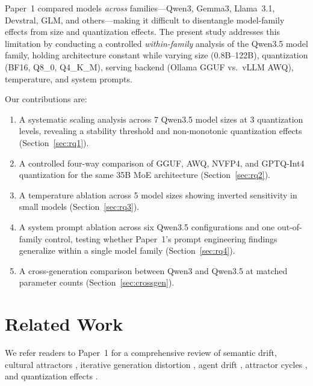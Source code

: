 \documentclass[11pt]{article}
\begin{document}
Paper~1 compared models \emph{across} families---Qwen3, Gemma3, Llama~3.1,
Devstral, GLM, and others---making it difficult to disentangle model-family
effects from size and quantization effects. The present study addresses this
limitation by conducting a controlled \emph{within-family} analysis of the
Qwen3.5 model family, holding architecture constant while varying size
(0.8B--122B), quantization (BF16, Q8\_0, Q4\_K\_M), serving backend
(Ollama GGUF vs.\ vLLM AWQ), temperature, and system prompts.

Our contributions are:
\begin{enumerate}[leftmargin=*]
  \item A systematic scaling analysis across 7 Qwen3.5 model sizes at 3
        quantization levels, revealing a stability threshold and non-monotonic
        quantization effects (Section~\ref{sec:rq1}).
  \item A controlled four-way comparison of GGUF, AWQ, NVFP4, and GPTQ-Int4
        quantization for the same 35B MoE architecture
        (Section~\ref{sec:rq2}).
  \item A temperature ablation across 5 model sizes showing inverted
        sensitivity in small models (Section~\ref{sec:rq3}).
  \item A system prompt ablation across six Qwen3.5 configurations and one
        out-of-family control, testing whether Paper~1's prompt engineering
        findings generalize within a single model family
        (Section~\ref{sec:rq4}).
  \item A cross-generation comparison between Qwen3 and Qwen3.5 at matched
        parameter counts (Section~\ref{sec:crossgen}).
\end{enumerate}

\section{Related Work}
\label{sec:related}

We refer readers to Paper~1 \citep{smith2026semantic} for a comprehensive
review of semantic drift, cultural attractors \citep{perez2025cultural,
brinkmann2023machine}, iterative generation distortion
\citep{mohamed2025broken}, agent drift \citep{rath2026agent}, attractor
cycles \citep{wang2025attractor, chytas2025concept}, and quantization
effects \citep{han2026quantization, hooper2024kvquant, liu2024kivi}.
\end{document}
